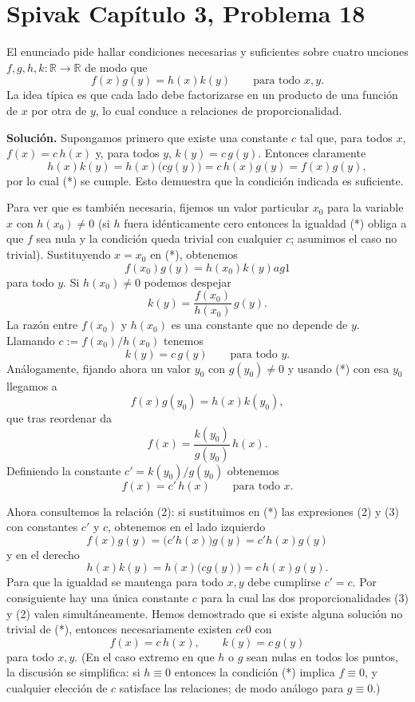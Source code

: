 \section*{Spivak Capítulo 3, Problema 18}

El enunciado pide hallar condiciones necesarias y suficientes sobre cuatrounciones
$f,g,h,k:\mathbb{R}\to\mathbb{R}$ de modo que
\[f(x)g(y)=h(x)k(y)\qquad\text{para todo }x,y.\tag{*}
\]
La idea típica es que cada lado debe factorizarse en un producto de una
función de $x$ por otra de $y$, lo cual conduce a relaciones de proporcionalidad.

\textbf{Solución.} Supongamos primero que existe una constante $c$ tal
que, para todos $x$, $f(x)=c\,h(x)$ y, para todos $y$, $k(y)=c\,g(y)$.
Entonces claramente
$$h(x)k(y) = h(x)\bigl(cg(y)\bigr) = c\,h(x)g(y) = f(x)g(y),$$
por lo cual (*) se cumple. Esto demuestra que la condición indicada es suficiente.

Para ver que es también necesaria, fijemos un valor particular $x_0$ para la
variable $x$ con $h(x_0)\neq0$ (si $h$ fuera idénticamente cero entonces
la igualdad (*) obliga a que $f$ sea nula y la condición queda trivial con
cualquier $c$; asumimos el caso no trivial). Sustituyendo $x=x_0$ en (*),
obtenemos
$$f(x_0)g(y) = h(x_0)k(y)	ag{1}
$$
para todo $y$. Si $h(x_0)\neq0$ podemos despejar
$$k(y)=\frac{f(x_0)}{h(x_0)}\,g(y).$$
La razón entre $f(x_0)$ y $h(x_0)$ es una constante que no depende de $y$.
Llamando $c:=f(x_0)/h(x_0)$ tenemos
\[k(y)=c\,g(y)\qquad\text{para todo }y.\tag{2}
\]
Análogamente, fijando ahora un valor $y_0$ con $g(y_0)\neq0$ y usando
(*) con esa $y_0$ llegamos a
$$f(x)g(y_0) = h(x)k(y_0),$$
que tras reordenar da
$$f(x) = \frac{k(y_0)}{g(y_0)}\,h(x).$$
Definiendo la constante
$c'=k(y_0)/g(y_0)$ obtenemos
\[f(x)=c'\,h(x)\qquad\text{para todo }x.\tag{3}
\]

Ahora consultemos la relación (2): si sustituimos en (*) las expresiones
(2) y (3) con constantes $c'$ y $c$, obtenemos
en el lado izquierdo
$$f(x)g(y)=\bigl(c'h(x)\bigr)g(y) = c'h(x)g(y)$$
y en el derecho
$$h(x)k(y)=h(x)\bigl(cg(y)\bigr) = c\,h(x)g(y).$$
Para que la igualdad se mantenga para todo $x,y$ debe cumplirse
$c'=c$. Por consiguiente hay una única constante $c$ para la cual las dos
proporcionalidades (3) y (2) valen simultáneamente. Hemos demostrado que si
existe alguna solución no trivial de (*), entonces necesariamente existen $c
e0$
con
$$f(x)=c\,h(x),\qquad k(y)=c\,g(y)$$
para todo $x,y$. (En el caso extremo en que $h$ o $g$ sean nulas en todos los
puntos, la discusión se simplifica: si $h\equiv0$ entonces la condición (*)
implica $f\equiv0$, y cualquier elección de $c$ satisface las relaciones; de
modo análogo para $g\equiv0$.)

